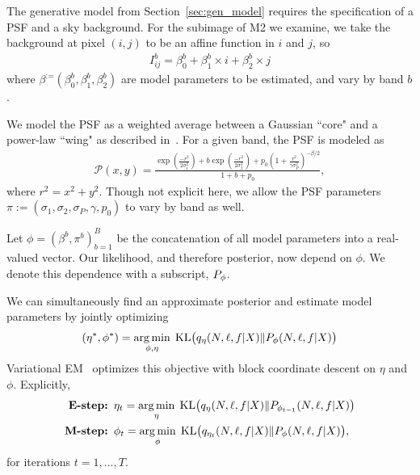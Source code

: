 The generative model from Section~\ref{sec:gen_model} requires
the specification of a PSF and a sky background. 
For the subimage of M2 we examine, 
we take the background at pixel $(i, j)$ to be an affine function in $i$ and $j$, so 
\begin{align}
    I_{ij}^{b} = \beta_0^{b} + \beta_1^{b} \times i + \beta_2^{b} \times j
\end{align}
where $\beta^ := (\beta_0^{b}, \beta_1^{b}, \beta_2^{b})$ are model parameters to be estimated, and 
vary by band $b$. 


We model the PSF as a weighted average between a Gaussian ``core" and a power-law ``wing" as described in~\cite{Xin2018psf}. For a given band, the PSF is modeled as 
\begin{align}
    \mathcal{P}(x, y) = \frac{\exp(\frac{-r^2}{2\sigma_1^2}) + 
                            b \exp(\frac{-r^2}{2\sigma_2^2}) + 
                            p_0(1 + \frac{r^2}{\gamma\sigma^2_P})^{-\beta/2} }{1 + b + p_0},
\end{align}
where $r^2 = x^2 + y^2$. Though not explicit here, we allow the PSF parameters
$\pi := (\sigma_1, \sigma_2, \sigma_P, \gamma, p_0)$ to vary by band as well. 

Let $\phi = (\beta^b, \pi^b)_{b = 1}^B$
be the concatenation of all model parameters into a real-valued vector. 
Our likelihood, and therefore posterior, now depend on $\phi$. We denote this dependence with a subscript, $P_\phi$. 

We can simultaneously find an approximate posterior and 
estimate model parameters by jointly optimizing 
\begin{align}
(\eta^*, \phi^*) = \operatorname*{arg\,min}_{\phi, \eta} \; \mathrm{KL}\big (q_{\eta}(N, \ell, f |X) \| P_{\phi}(N, \ell, f | X)\big)\label{eq:em_obj}
\end{align}
Variational EM~\cite{Jordan_intro_vi, neal2000varem, Beal2002varem} optimizes this objective with block coordinate descent on $\eta$ and $\phi$. Explicitly, 
\begin{align}
    \text{{\bf E-step: }} & 
    \eta_{t} = \operatorname*{arg\,min}_\eta \; \mathrm{KL}\big (q_{\eta    }(N, \ell, f |X) \| P_{\phi_{t - 1}}(N, \ell, f | X)\big)
    \label{eq:e_step}
    \\
    \text{{\bf M-step: }} & \phi_{t} = \operatorname*{arg\,min}_{\phi} \; \mathrm{KL}\big (q_{\eta_t}(N, \ell, f |X) \| P_{\phi}(N, \ell, f | X)\big), 
    \label{eq:m_step}
\end{align}
for iterations $t = 1, ..., T$. 

